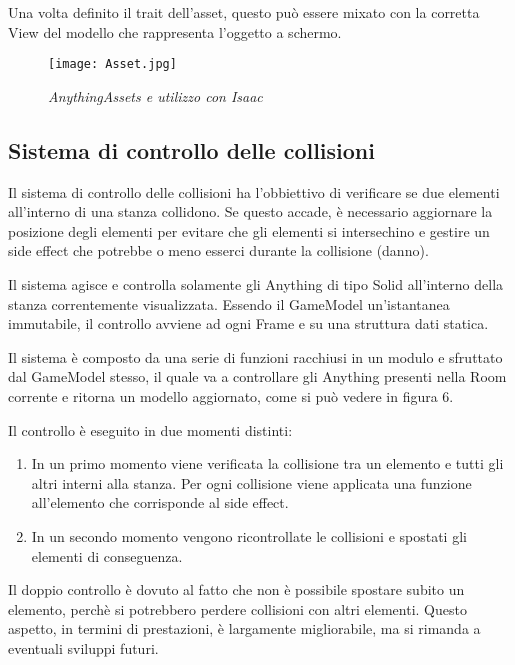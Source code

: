 Una volta definito il trait dell'asset, questo può essere mixato con la corretta View del modello che rappresenta l'oggetto a schermo.


\begin{figure}[!hbt]
    \centering
    \texttt{[image: Asset.jpg]}
    \caption{\textit{AnythingAssets e utilizzo con Isaac}} 
\end{figure}


\subsection{Sistema di controllo delle collisioni}
Il sistema di controllo delle collisioni ha l'obbiettivo di verificare se due elementi all'interno di una stanza collidono. 
Se questo accade, è necessario aggiornare la posizione degli elementi per evitare che gli elementi si intersechino e gestire un side effect che potrebbe o meno esserci durante la collisione (danno). 

Il sistema agisce e controlla solamente gli Anything di tipo Solid all'interno della stanza correntemente visualizzata.
Essendo il GameModel un'istantanea immutabile, il controllo avviene ad ogni Frame e su una struttura dati statica. 

Il sistema è composto da una serie di funzioni racchiusi in un modulo e sfruttato dal GameModel stesso, il quale va a controllare gli Anything presenti nella Room corrente e ritorna un modello aggiornato, come si può vedere in figura 6.

Il controllo è eseguito in due momenti distinti: 
\begin{enumerate}
  \item In un primo momento viene verificata la collisione tra un elemento e tutti gli altri interni alla stanza. Per ogni collisione viene applicata una funzione all'elemento che corrisponde al side effect.
  \item In un secondo momento vengono ricontrollate le collisioni e spostati gli elementi di conseguenza. 
\end{enumerate}

Il doppio controllo è dovuto al fatto che non è possibile spostare subito un elemento, perchè si potrebbero perdere collisioni con altri elementi.
Questo aspetto, in termini di prestazioni, è largamente migliorabile, ma si rimanda a eventuali sviluppi futuri.

